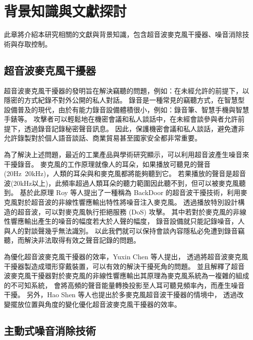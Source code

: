 \chapter{背景知識與文獻探討}

    此章將介紹本研究相關的文獻與背景知識，包含超音波麥克風干擾器、噪音消除技術與存取控制。


\section{超音波麥克風干擾器}

    超音波麥克風干擾器的發明旨在解決竊聽的問題，例如：在未經允許的前提下，以隱密的方式紀錄不對外公開的私人對話。
錄音是一種常見的竊聽方式，在智慧型設備普及的現代，由於有能力錄音設備體積很小，例如：錄音筆、智慧手機與智慧手錶等。
攻擊者可以輕鬆地在機密會議和私人談話中，在未經會談參與者允許前提下，透過錄音記錄秘密聲音訊息。
因此，保護機密會議和私人談話，避免遭非允許錄製對於個人語音談話、商業貿易甚至國家安全都非常重要。

    為了解決上述問題，最近的工業產品與學術研究\cite{chen2020wearable}顯示，可以利用超音波產生噪音來干擾錄音。
麥克風的工作原理就像人的耳朵，如果播放可聽見的聲音(20Hz~20kHz)，人類的耳朵與和麥克風都將能夠聽到它。
若果播放的聲音是超音波(20kHz以上)，此頻率超過人類耳朵的聽力範圍因此聽不到，但可以被麥克風聽到。
基於此原理 Roy 等人提出了一種稱為 BackDoor 的超音波干擾技術，利用麥克風對於超音波的非線性響應輸出特性將噪音注入麥克風。
透過播放特別設計構造的超音波，可以對麥克風執行拒絕服務 (DoS) 攻擊\cite{roy2017backdoor}。
其中若對於麥克風的非線性響應輸出產生的噪音的幅度若大於人聲的幅度，
錄音設備就只能記錄噪音，人與人的對談聲幾乎無法識別\cite{shen2019jamsys}。
以此我們就可以保持會談內容隱私必免遭到錄音竊聽，而解決非法取得有效之聲音記錄的問題。

    為優化超音波麥克風干擾器的效率，Yuxin Chen 等人提出，
透過將超音波麥克風干擾器製造成環形穿戴裝置，可以有效的解決干擾死角的問題\cite{chen2020demonstrating}。
並且解釋了超音波麥克風干擾器對於麥克風的非線性響應輸出其原理為麥克風系統為一複雜的組成的不可知系統，
會將高頻的聲音能量轉換投影至人耳可聽見頻率內，而產生噪音干擾\cite{chen2019understanding}。
另外，Hao Shen 等人也提出於多麥克風超音波干擾器的情境中，
透過改變擺放位置與角度的變化優化超音波麥克風干擾器的效率\cite{shen2019jamsys}。


\section{主動式噪音消除技術}

